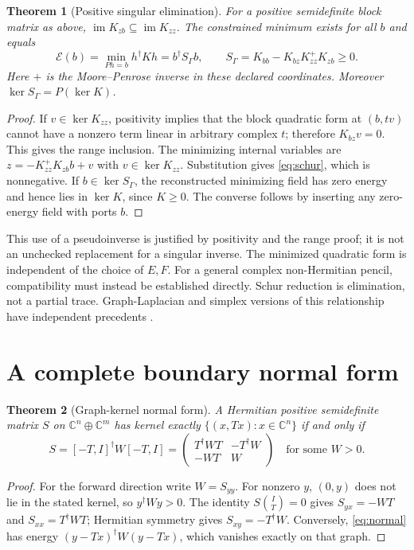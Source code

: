 \documentclass[11pt]{article}
\newtheorem{theorem}{Theorem}[section]
\theoremstyle{definition}
\newcommand{\C}{\mathbb C}
\newcommand{\im}{\operatorname{im}}
\begin{document}
\begin{theorem}[Positive singular elimination]\label{thm:schur}
For a positive semidefinite block matrix as above,
$\im K_{zb}\subseteq\im K_{zz}$. The constrained minimum exists for all $b$
and equals
\begin{equation}\label{eq:schur}
 \mathcal E(b)=\min_{Ph=b}h^\dagger Kh=b^\dagger S_\Gamma b,
 \qquad
 S_\Gamma=K_{bb}-K_{bz}K_{zz}^{+}K_{zb}\ge0.
\end{equation}
Here $+$ is the Moore--Penrose inverse in these declared coordinates.
Moreover $\ker S_\Gamma=P(\ker K)$.
\end{theorem}
\begin{proof}
If $v\in\ker K_{zz}$, positivity implies that the block quadratic
form at $(b,tv)$ cannot have a nonzero term linear in arbitrary complex
$t$; therefore $K_{bz}v=0$. This gives the range inclusion.
The minimizing internal variables are
$z=-K_{zz}^{+}K_{zb}b+v$ with $v\in\ker K_{zz}$.
Substitution gives \eqref{eq:schur}, which is nonnegative.
If $b\in\ker S_\Gamma$, the reconstructed minimizing field has zero
energy and hence lies in $\ker K$, since $K\ge0$.
The converse follows by inserting any zero-energy field with ports $b$.
\end{proof}
This use of a pseudoinverse is justified by positivity and the range
proof; it is not an unchecked replacement for a singular inverse.
The minimized quadratic form is independent of the choice of $E,F$.
For a general complex non-Hermitian pencil, compatibility must instead
be established directly. Schur reduction is elimination, not a partial
trace. Graph-Laplacian and simplex versions of this relationship have
independent precedents \cite{devriendt}.

\section{A complete boundary normal form}\label{sec:normal}
\begin{theorem}[Graph-kernel normal form]\label{thm:normal}
A Hermitian positive semidefinite matrix $S$ on $\C^n\oplus\C^m$
has kernel exactly $\{(x,Tx):x\in\C^n\}$ if and only if
\begin{equation}\label{eq:normal}
 S=[-T,I]^\dagger W[-T,I]
 =\begin{pmatrix}T^\dagger WT&-T^\dagger W\\-WT&W\end{pmatrix}
 \quad\text{for some }W>0.
\end{equation}
\end{theorem}
\begin{proof}
For the forward direction write $W=S_{yy}$. For nonzero $y$, $(0,y)$
does not lie in the stated kernel, so $y^\dagger Wy>0$.
The identity $S\binom{I}{T}=0$ gives
$S_{yx}=-WT$ and $S_{xx}=T^\dagger WT$; Hermitian symmetry gives
$S_{xy}=-T^\dagger W$. Conversely, \eqref{eq:normal} has energy
$(y-Tx)^\dagger W(y-Tx)$, which vanishes exactly on that graph.
\end{proof}
\end{document}
